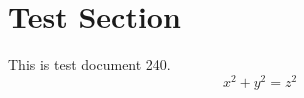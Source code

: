 \documentclass{article}
\begin{document}
\section{Test Section}
This is test document 240.
\begin{equation}
x^2 + y^2 = z^2
\end{equation}
\end{document}
